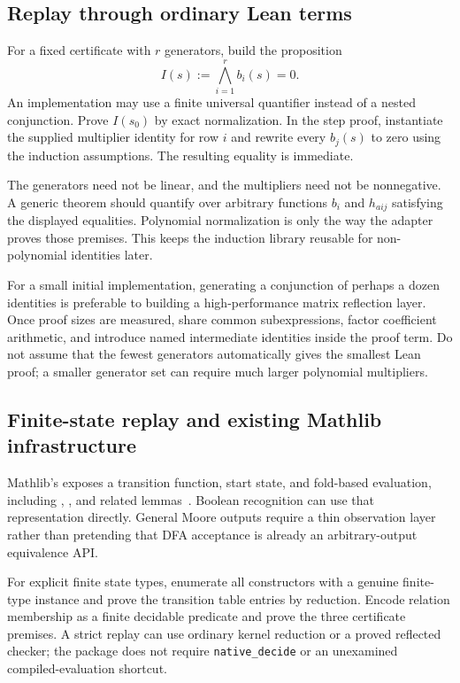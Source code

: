 \subsection{Replay through ordinary Lean terms}

For a fixed certificate with $r$ generators, build the proposition
\[
 I(s):=\bigwedge_{i=1}^r b_i(s)=0.
\]
An implementation may use a finite universal quantifier instead of a nested conjunction. Prove $I(s_0)$ by exact normalization. In the step proof, instantiate the supplied multiplier identity for row $i$ and rewrite every $b_j(s)$ to zero using the induction assumptions. The resulting equality is immediate.

The generators need not be linear, and the multipliers need not be nonnegative. A generic theorem should quantify over arbitrary functions $b_i$ and $h_{aij}$ satisfying the displayed equalities. Polynomial normalization is only the way the adapter proves those premises. This keeps the induction library reusable for non-polynomial identities later.

For a small initial implementation, generating a conjunction of perhaps a dozen identities is preferable to building a high-performance matrix reflection layer. Once proof sizes are measured, share common subexpressions, factor coefficient arithmetic, and introduce named intermediate identities inside the proof term. Do not assume that the fewest generators automatically gives the smallest Lean proof; a smaller generator set can require much larger polynomial multipliers.

\subsection{Finite-state replay and existing Mathlib infrastructure}

Mathlib's  exposes a transition function, start state, and fold-based evaluation, including , , and related lemmas~\cite{mathlib-dfa}. Boolean recognition can use that representation directly. General Moore outputs require a thin observation layer rather than pretending that DFA acceptance is already an arbitrary-output equivalence API.

For explicit finite state types, enumerate all constructors with a genuine finite-type instance and prove the transition table entries by reduction. Encode relation membership as a finite decidable predicate and prove the three certificate premises. A strict replay can use ordinary kernel reduction or a proved reflected checker; the package does not require \texttt{native\_decide} or an unexamined compiled-evaluation shortcut.

